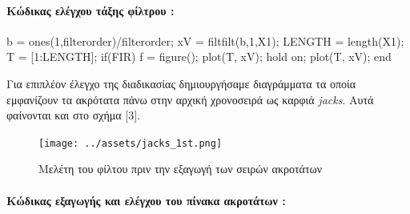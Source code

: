 \documentclass[11pt,]{article}
\newenvironment{Shaded}{}{}
\newcommand{\FloatTok}[1]{\textcolor[rgb]{0.25,0.63,0.44}{#1}}
\newcommand{\NormalTok}[1]{#1}
\let\oldparagraph\paragraph
\renewcommand{\paragraph}[1]{\oldparagraph{#1}\mbox{}}
\begin{document}
\hypertarget{ux3baux3ceux3b4ux3b9ux3baux3b1ux3c2-ux3b5ux3bbux3adux3b3ux3c7ux3bfux3c5-ux3c4ux3acux3beux3b7ux3c2-ux3c6ux3afux3bbux3c4ux3c1ux3bfux3c5}{%
\paragraph{Κώδικας ελέγχου τάξης φίλτρου
:}\label{ux3baux3ceux3b4ux3b9ux3baux3b1ux3c2-ux3b5ux3bbux3adux3b3ux3c7ux3bfux3c5-ux3c4ux3acux3beux3b7ux3c2-ux3c6ux3afux3bbux3c4ux3c1ux3bfux3c5}}

\begin{Shaded}
\begin{Highlighting}[]
\NormalTok{  b = ones(}\FloatTok{1}\NormalTok{,filterorder)/filterorder;}
\NormalTok{  xV = filtfilt(b,}\FloatTok{1}\NormalTok{,X1);}
\NormalTok{  LENGTH = length(X1);}
\NormalTok{  T = [}\FloatTok{1}\NormalTok{:LENGTH];}
\NormalTok{  if(FIR)}
\NormalTok{    f = figure();}
\NormalTok{    plot(T, xV);}
\NormalTok{    hold on;}
\NormalTok{    plot(T, xV);}
\NormalTok{  end}
\end{Highlighting}
\end{Shaded}

Για επιπλέον έλεγχο της διαδικασίας δημιουργήσαμε διαγράμματα τα οποία
εμφανίζουν τα ακρότατα πάνω στην αρχική χρονοσειρά ως καρφιά
\emph{jacks}. Αυτά φαίνονται και στο σχήμα {[}3{]}.

\begin{figure}
\centering
\texttt{[image: ../assets/jacks\_1st.png]}
\caption{Μελέτη του φίλτου πριν την εξαγωγή των σειρών ακροτάτων}
\end{figure}

\hypertarget{ux3baux3ceux3b4ux3b9ux3baux3b1ux3c2-ux3b5ux3beux3b1ux3b3ux3c9ux3b3ux3aeux3c2-ux3baux3b1ux3b9-ux3b5ux3bbux3adux3b3ux3c7ux3bfux3c5-ux3c4ux3bfux3c5-ux3c0ux3afux3bdux3b1ux3baux3b1-ux3b1ux3baux3c1ux3bfux3c4ux3acux3c4ux3c9ux3bd}{%
\paragraph{Κώδικας εξαγωγής και ελέγχου του πίνακα ακροτάτων
:}\label{ux3baux3ceux3b4ux3b9ux3baux3b1ux3c2-ux3b5ux3beux3b1ux3b3ux3c9ux3b3ux3aeux3c2-ux3baux3b1ux3b9-ux3b5ux3bbux3adux3b3ux3c7ux3bfux3c5-ux3c4ux3bfux3c5-ux3c0ux3afux3bdux3b1ux3baux3b1-ux3b1ux3baux3c1ux3bfux3c4ux3acux3c4ux3c9ux3bd}}
\end{document}
